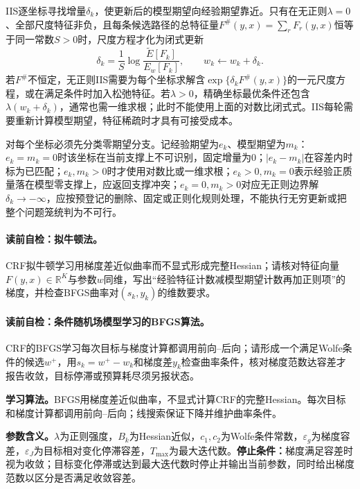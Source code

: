 IIS逐坐标寻找增量$\delta_k$，使更新后的模型期望向经验期望靠近。只有在无正则$\lambda=0$、全部尺度特征非负，且每条候选路径的总特征量$F^{\#}(y,x)=\sum_rF_r(y,x)$恒等于同一常数$S>0$时，尺度方程才化为闭式更新
\[
\delta_k=\frac1S\log
\frac{\widetilde E[F_k]}{E_w[F_k]},
\qquad w_k\leftarrow w_k+\delta_k.
\]
若$F^{\#}$不恒定，无正则IIS需要为每个坐标求解含$\exp\{\delta_kF^{\#}(y,x)\}$的一元尺度方程，或在满足条件时加入松弛特征。若$\lambda>0$，精确坐标最优条件还包含$\lambda(w_k+\delta_k)$，通常也需一维求根；此时不能使用上面的对数比闭式式。IIS每轮需要重新计算模型期望，特征稀疏时才具有可接受成本。

对每个坐标必须先分类零期望分支。记经验期望为$e_k$、模型期望为$m_k$：$e_k=m_k=0$时该坐标在当前支撑上不可识别，固定增量为0；$|e_k-m_k|$在容差内时标为已匹配；$e_k,m_k>0$时才使用对数比或一维求根；$e_k>0,m_k=0$表示经验正质量落在模型零支撑上，应返回支撑冲突；$e_k=0,m_k>0$对应无正则边界解$\delta_k\to-\infty$，应按预登记的删除、固定或正则化规则处理，不能执行无穷更新或把整个问题笼统判为不可行。

\paragraph{读前自检：拟牛顿法。}CRF拟牛顿学习用梯度差近似曲率而不显式形成完整Hessian；请核对特征向量$F(y,x)\in\mathbb R^K$与参数$w$同维，写出“经验特征计数减模型期望计数再加正则项”的梯度，并检查BFGS曲率对$(s_k,y_k)$的维数要求。\par
\paragraph{读前自检：条件随机场模型学习的BFGS算法。}CRF的BFGS学习每次目标与梯度计算都调用前向--后向；请形成一个满足Wolfe条件的候选$w^+$，用$s_k=w^+-w_k$和梯度差$y_k$检查曲率条件，核对梯度范数达容差才报告收敛，目标停滞或预算耗尽须另报状态。\par

\label{struct:V3-C06-CH10}
\textbf{学习算法。}BFGS用梯度差近似曲率，不显式计算CRF的完整Hessian。每次目标和梯度计算都调用前向--后向；线搜索保证下降并维护曲率条件。

\label{struct:V3-C06-CH21}
\textbf{参数含义。}$\lambda$为正则强度，$B_k$为Hessian近似，$c_1,c_2$为Wolfe条件常数，$\varepsilon_g$为梯度容差，$\varepsilon_J$为目标相对变化停滞容差，$T_{\max}$为最大迭代数。\textbf{停止条件：}梯度满足容差时视为收敛；目标变化停滞或达到最大迭代数时停止并输出当前参数，同时给出梯度范数以区分是否满足收敛容差。

